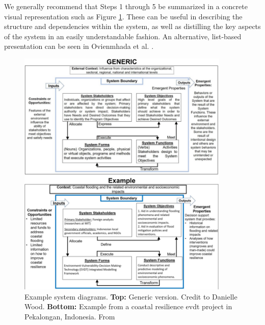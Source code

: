 We generally recommend that Steps 1 through 5 be summarized in a concrete visual representation such as Figure \ref{fig:system-diagram}. These can be useful in describing the structure and dependencies within the system, as well as distilling the key aspects of the system in an easily understandable fashion. An alternative, list-based presentation can be seen in Ovienmhada et al. \cite{ovienmhadaInclusiveDesignEarth2021}.

\clearpage

\begin{figure}[!htb] 
\centering
\includegraphics[width=0.9\textwidth]{Figures/chap3/system-diagram-combined.png}
\caption[Example system diagrams]{Example system diagrams. \textbf{Top:} Generic version. Credit to Danielle Wood. \textbf{Bottom:} Example from a coastal resilience \ac{evdt} project in Pekalongan, Indonesia. From \cite{lombardoEnvironmentVulnerabilityDecisionTechnologyFrameworkDecision2022}}
\label{fig:system-diagram}
\end{figure}




